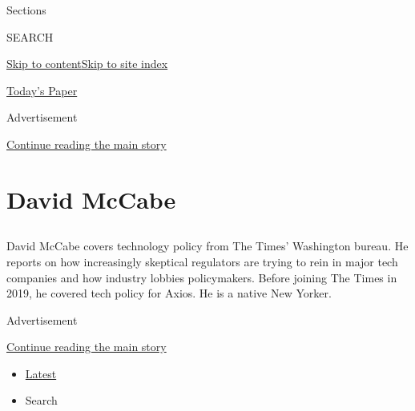 Sections

SEARCH

\protect\hyperlink{site-content}{Skip to
content}\protect\hyperlink{site-index}{Skip to site index}

\href{https://myaccount.nytimes.com/auth/login?response_type=cookie\&client_id=vi}{}

\href{https://www.nytimes.com/section/todayspaper}{Today's Paper}

Advertisement

\protect\hyperlink{after-top}{Continue reading the main story}

\hypertarget{david-mccabe}{%
\section{David McCabe}\label{david-mccabe}}

\subsection{}

David McCabe covers technology policy from The Times' Washington bureau.
He reports on how increasingly skeptical regulators are trying to rein
in major tech companies and how industry lobbies policymakers. Before
joining The Times in 2019, he covered tech policy for Axios. He is a
native New Yorker.

Advertisement

\protect\hyperlink{after-mid1}{Continue reading the main story}

\begin{itemize}
\tightlist
\item
  \protect\hyperlink{stream-panel}{Latest}
\item
  Search
\end{itemize}

